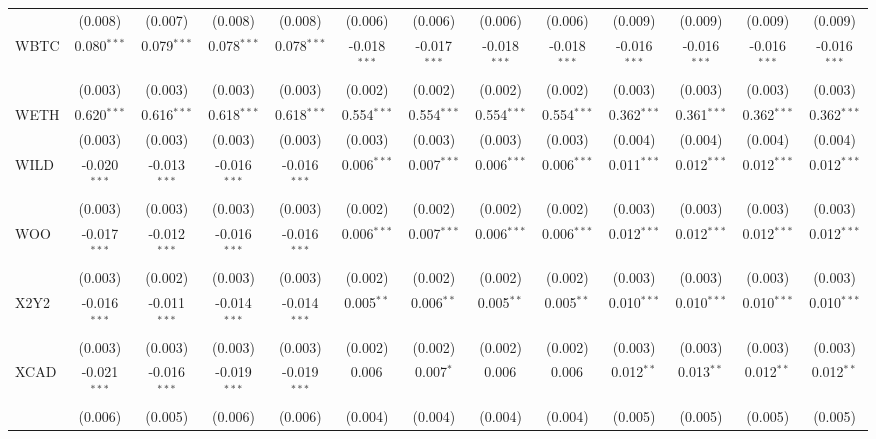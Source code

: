 \begin{table}[!htbp]
\begin{tabular}{@{\extracolsep{5pt}}lcccccccccccc}
  & (0.008) & (0.007) & (0.008) & (0.008) & (0.006) & (0.006) & (0.006) & (0.006) & (0.009) & (0.009) & (0.009) & (0.009) \\
 WBTC & 0.080$^{***}$ & 0.079$^{***}$ & 0.078$^{***}$ & 0.078$^{***}$ & -0.018$^{***}$ & -0.017$^{***}$ & -0.018$^{***}$ & -0.018$^{***}$ & -0.016$^{***}$ & -0.016$^{***}$ & -0.016$^{***}$ & -0.016$^{***}$ \\
  & (0.003) & (0.003) & (0.003) & (0.003) & (0.002) & (0.002) & (0.002) & (0.002) & (0.003) & (0.003) & (0.003) & (0.003) \\
 WETH & 0.620$^{***}$ & 0.616$^{***}$ & 0.618$^{***}$ & 0.618$^{***}$ & 0.554$^{***}$ & 0.554$^{***}$ & 0.554$^{***}$ & 0.554$^{***}$ & 0.362$^{***}$ & 0.361$^{***}$ & 0.362$^{***}$ & 0.362$^{***}$ \\
  & (0.003) & (0.003) & (0.003) & (0.003) & (0.003) & (0.003) & (0.003) & (0.003) & (0.004) & (0.004) & (0.004) & (0.004) \\
 WILD & -0.020$^{***}$ & -0.013$^{***}$ & -0.016$^{***}$ & -0.016$^{***}$ & 0.006$^{***}$ & 0.007$^{***}$ & 0.006$^{***}$ & 0.006$^{***}$ & 0.011$^{***}$ & 0.012$^{***}$ & 0.012$^{***}$ & 0.012$^{***}$ \\
  & (0.003) & (0.003) & (0.003) & (0.003) & (0.002) & (0.002) & (0.002) & (0.002) & (0.003) & (0.003) & (0.003) & (0.003) \\
 WOO & -0.017$^{***}$ & -0.012$^{***}$ & -0.016$^{***}$ & -0.016$^{***}$ & 0.006$^{***}$ & 0.007$^{***}$ & 0.006$^{***}$ & 0.006$^{***}$ & 0.012$^{***}$ & 0.012$^{***}$ & 0.012$^{***}$ & 0.012$^{***}$ \\
  & (0.003) & (0.002) & (0.003) & (0.003) & (0.002) & (0.002) & (0.002) & (0.002) & (0.003) & (0.003) & (0.003) & (0.003) \\
 X2Y2 & -0.016$^{***}$ & -0.011$^{***}$ & -0.014$^{***}$ & -0.014$^{***}$ & 0.005$^{**}$ & 0.006$^{**}$ & 0.005$^{**}$ & 0.005$^{**}$ & 0.010$^{***}$ & 0.010$^{***}$ & 0.010$^{***}$ & 0.010$^{***}$ \\
  & (0.003) & (0.003) & (0.003) & (0.003) & (0.002) & (0.002) & (0.002) & (0.002) & (0.003) & (0.003) & (0.003) & (0.003) \\
 XCAD & -0.021$^{***}$ & -0.016$^{***}$ & -0.019$^{***}$ & -0.019$^{***}$ & 0.006$^{}$ & 0.007$^{*}$ & 0.006$^{}$ & 0.006$^{}$ & 0.012$^{**}$ & 0.013$^{**}$ & 0.012$^{**}$ & 0.012$^{**}$ \\
  & (0.006) & (0.005) & (0.006) & (0.006) & (0.004) & (0.004) & (0.004) & (0.004) & (0.005) & (0.005) & (0.005) & (0.005) \\

\end{tabular}
\end{table}
